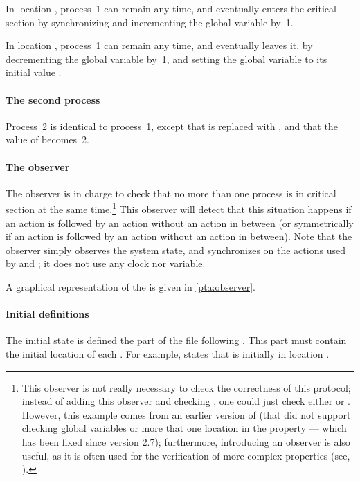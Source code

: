 In location , process~1 can remain any time, and eventually enters the critical section by synchronizing  and incrementing the global variable  by~1.

In location , process~1 can remain any time, and eventually leaves it, by decrementing the global variable  by~1, and setting the global variable  to its initial value .

\paragraph{The second process}
Process~2 is identical to process~1, except that  is replaced with , and that the value of  becomes~2.


\paragraph{The observer}
The observer is in charge to check that no more than one process is in critical section at the same time.\footnote{%
	This observer is not really necessary to check the correctness of this protocol;
	instead of adding this observer and checking , one could just check either  or .
	However, this example comes from an earlier version of \imitator{} (that did not support checking global variables or more that one location in the  property --- which has been fixed since version 2.7); furthermore, introducing an observer is also useful, as it is often used for the verification of more complex properties (see, \eg{} \cite{ABL98,ABBL98}).
}
This observer will detect that this situation happens if an action  is followed by an action  without an action  in between (or symmetrically if an action  is followed by an action  without an action  in between).
Note that the observer simply observes the system state, and synchronizes on the actions used by  and ; it does not use any clock nor variable.

A graphical representation of the \IPTA{}  is given in \cref{pta:observer}.


\paragraph{Initial definitions}
The initial state is defined the part of the file following .
This part must contain the initial location of each \IPTA{}.
For example,  states that  is initially in location .

